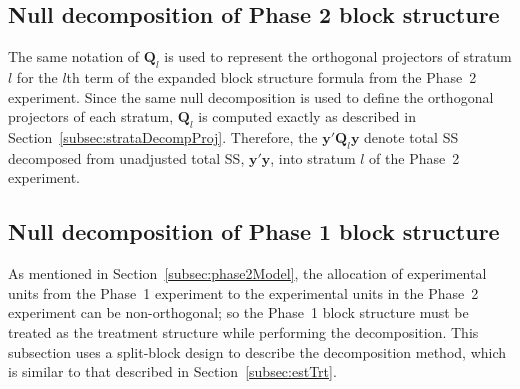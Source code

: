 \documentclass[article]{jss}
\newcommand{\Q}{\mathbf{Q}}
\begin{document}
\subsection{Null decomposition of Phase 2 block structure}
The same notation of $\Q_l$ is used to represent the orthogonal projectors of stratum $l$ for the $l$th term of the expanded block structure formula from the Phase~2 experiment. Since the same null decomposition is used to define the orthogonal projectors of each stratum, $\Q_l$ is computed exactly as described in Section~\ref{subsec:strataDecompProj}. Therefore, the $\bm{y}' \Q_l \bm{y}$ denote total SS decomposed from unadjusted total SS, $\bm{y}'\bm{y}$, into stratum $l$ of the Phase~2 experiment.   

\subsection{Null decomposition of Phase 1 block structure}
As mentioned in Section~\ref{subsec:phase2Model}, the allocation of experimental units from the Phase~1 experiment to the experimental units in the Phase~2 experiment can be non-orthogonal; so the Phase~1 block structure must be treated as the treatment structure while performing the decomposition. This subsection uses a split-block design to describe the decomposition method, which is similar to that described in Section~\ref{subsec:estTrt}.
\end{document}
